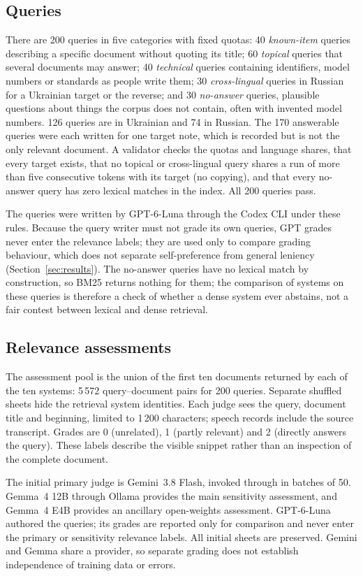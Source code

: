 \subsection{Queries}
There are 200 queries in five categories with fixed quotas: 40 \emph{known-item} queries describing a specific document without quoting its title; 60 \emph{topical} queries that several documents may answer; 40 \emph{technical} queries containing identifiers, model numbers or standards as people write them; 30 \emph{cross-lingual} queries in Russian for a Ukrainian target or the reverse; and 30 \emph{no-answer} queries, plausible questions about things the corpus does not contain, often with invented model numbers. 126 queries are in Ukrainian and 74 in Russian. The 170 answerable queries were each written for one target note, which is recorded but is not the only relevant document. A validator checks the quotas and language shares, that every target exists, that no topical or cross-lingual query shares a run of more than five consecutive tokens with its target (no copying), and that every no-answer query has zero lexical matches in the index. All 200 queries pass.

The queries were written by GPT-6-Luna through the Codex CLI under these rules. Because the query writer must not grade its own queries, GPT grades never enter the relevance labels; they are used only to compare grading behaviour, which does not separate self-preference from general leniency (Section~\ref{sec:results}). The no-answer queries have no lexical match by construction, so BM25 returns nothing for them; the comparison of systems on these queries is therefore a check of whether a dense system ever abstains, not a fair contest between lexical and dense retrieval.

\subsection{Relevance assessments}
The assessment pool is the union of the first ten documents returned by each of the ten systems: 5\,572 query--document pairs for 200 queries. Separate shuffled sheets hide the retrieval system identities. Each judge sees the query, document title and beginning, limited to 1\,200 characters; speech records include the source transcript. Grades are 0 (unrelated), 1 (partly relevant) and 2 (directly answers the query). These labels describe the visible snippet rather than an inspection of the complete document.

The initial primary judge is Gemini~3.8 Flash, invoked through  in batches of 50. Gemma~4 12B through Ollama provides the main sensitivity assessment, and Gemma~4 E4B provides an ancillary open-weights assessment. GPT-6-Luna authored the queries; its grades are reported only for comparison and never enter the primary or sensitivity relevance labels. All initial sheets are preserved. Gemini and Gemma share a provider, so separate grading does not establish independence of training data or errors.

